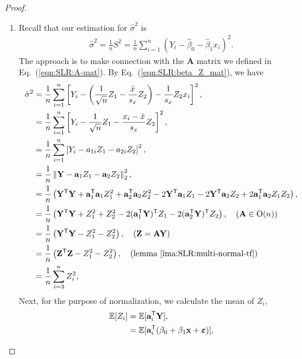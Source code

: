 \documentclass{book}
\begin{document}
\begin{proof}
\begin{enumerate}
\item Recall that our estimation for $\hat\sigma^2$ is 
\begin{align*}
    \hat\sigma^2 = \frac{1}{n}S^2 = \frac{1}{n}\sum_{i=1}^n(Y_i - \hat\beta_0 - \hat\beta_1 x_i)^2.
\end{align*}
The approach is to make connection with the $\mathbf{A}$ matrix we defined in Eq.~(\ref{eqn:SLR:A-mat}). By Eq.~(\ref{eqn:SLR:beta_Z_mat}), we have
\begin{align*}
    \hat\sigma^2 &= \frac{1}{n}\sum_{i=1}^n\left[Y_i - \left(\frac{1}{\sqrt{n}}Z_1 - \frac{\bar{x}}{s_x} Z_2\right) - \frac{1}{s_x} Z_2 x_i\right]^2,\\
    &= \frac{1}{n}\sum_{i=1}^n
    \left[
    Y_i - 
    \frac{1}{\sqrt{n}}Z_1 - \frac{x_i - \bar{x}}{s_x} Z_2 
    \right]^2,\\
    &= \frac{1}{n}\sum_{i=1}^n
    \left[
    Y_i - 
    a_{1i}Z_1 - a_{2i} Z_2
    \right]^2,\\
    &= \frac{1}{n}\left\|
    \mathbf{Y} -
    \mathbf{a}_{1} Z_1 -
    \mathbf{a}_{2} Z_2
    \right\|_2^2,\\
    &= 
    \frac{1}{n}\left(
    \mathbf{Y}^{\mathsf{T}} \mathbf{Y} +
    \mathbf{a}_{1}^{\mathsf{T}} \mathbf{a}_{1}Z_1^2 +
    \mathbf{a}_{2}^{\mathsf{T}} \mathbf{a}_{2} Z_2^2 - 
    2 \mathbf{Y}^{\mathsf{T}} \mathbf{a}_{1} Z_1 - 
    2 \mathbf{Y}^{\mathsf{T}} \mathbf{a}_{2} Z_2 +
    2 \mathbf{a}_{1}^{\mathsf{T}} \mathbf{a}_{2} Z_1 Z_2
    \right)
    ,\\
    &= 
    \frac{1}{n}\left(
    \mathbf{Y}^{\mathsf{T}} \mathbf{Y} +
    Z_1^2 +
    Z_2^2 - 
    2 (\mathbf{a}_{1}^{\mathsf{T}} \mathbf{Y})^{\mathsf{T}} Z_1 - 
    2 (\mathbf{a}_{2}^{\mathsf{T}} \mathbf{Y})^{\mathsf{T}} Z_2 
    \right)
    ,\quad (\mathbf{A} \in \mathrm{O}(n))\\
    &= 
    \frac{1}{n}\left(
    \mathbf{Y}^{\mathsf{T}} \mathbf{Y} -
    Z_1^2 -
    Z_2^2 
    \right)
    ,\quad (\mathbf{Z} = \mathbf{A}\mathbf{Y})\\
    &= 
    \frac{1}{n}\left(
    \mathbf{Z}^{\mathsf{T}} \mathbf{Z} -
    Z_1^2 -
    Z_2^2 
    \right)
    ,\quad \text{(lemma~\ref{lma:SLR:multi-normal-tf})}\\
    &= 
    \frac{1}{n}\sum_{i=3}^{n}Z_i^2,\\
\end{align*}
Next, for the purpose of normalization, we calculate the mean of $Z_i$,
\begin{align*}
    \mathbb{E}[Z_i] &= \mathbb{E}[\mathbf{a}_i^\T \mathbf{Y}],\\
    &= \mathbb{E}[\mathbf{a}_i^\T (\beta_0 + \beta_1 \mathbf{x} + \boldsymbol{\varepsilon})],\\

\end{align*}
\end{enumerate}
\end{proof}
\end{document}
